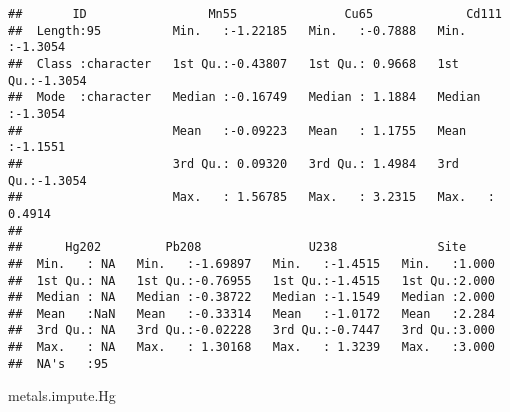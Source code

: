 \documentclass[]{article}
\newenvironment{Shaded}{\begin{snugshade}}{\end{snugshade}}
\newcommand{\NormalTok}[1]{#1}
\begin{document}
\begin{verbatim}
##       ID                 Mn55               Cu65             Cd111        
##  Length:95          Min.   :-1.22185   Min.   :-0.7888   Min.   :-1.3054  
##  Class :character   1st Qu.:-0.43807   1st Qu.: 0.9668   1st Qu.:-1.3054  
##  Mode  :character   Median :-0.16749   Median : 1.1884   Median :-1.3054  
##                     Mean   :-0.09223   Mean   : 1.1755   Mean   :-1.1551  
##                     3rd Qu.: 0.09320   3rd Qu.: 1.4984   3rd Qu.:-1.3054  
##                     Max.   : 1.56785   Max.   : 3.2315   Max.   : 0.4914  
##                                                                           
##      Hg202         Pb208               U238              Site      
##  Min.   : NA   Min.   :-1.69897   Min.   :-1.4515   Min.   :1.000  
##  1st Qu.: NA   1st Qu.:-0.76955   1st Qu.:-1.4515   1st Qu.:2.000  
##  Median : NA   Median :-0.38722   Median :-1.1549   Median :2.000  
##  Mean   :NaN   Mean   :-0.33314   Mean   :-1.0172   Mean   :2.284  
##  3rd Qu.: NA   3rd Qu.:-0.02228   3rd Qu.:-0.7447   3rd Qu.:3.000  
##  Max.   : NA   Max.   : 1.30168   Max.   : 1.3239   Max.   :3.000  
##  NA's   :95
\end{verbatim}

\begin{Shaded}
\begin{Highlighting}[]
\NormalTok{metals.impute.Hg}
\end{Highlighting}
\end{Shaded}
\end{document}
